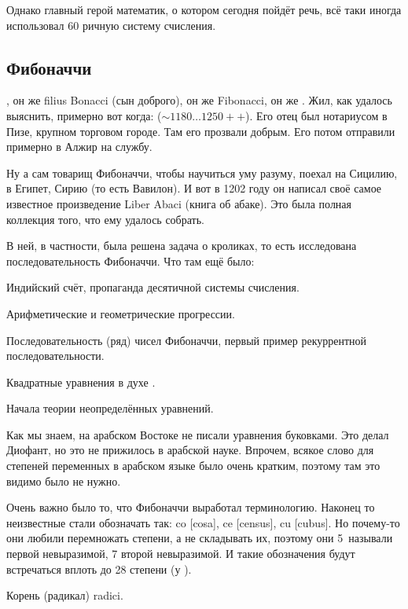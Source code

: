 \documentclass[a4paper,oneside,fleqn,10pt]{article}
\newcommand{\pe}[2]{${#1}\ldots{#2}$}
\begin{document}
Однако главный герой математик, о котором сегодня пойдёт речь, всё таки иногда
использовал 60 ричную систему счисления.

\subsection{Фибоначчи}

, он же filius Bonacci (сын доброго), он же
Fibonacci, он же . Жил, как удалось выяснить, примерно вот когда:
(\pe{\sim 1180}{1250{+}{+}}).
Его отец был нотариусом в Пизе, крупном торговом городе.
Там его прозвали добрым. Его потом отправили примерно в Алжир на службу.

Ну а сам товарищ Фибоначчи, чтобы научиться уму разуму, поехал на Сицилию, в Египет, Сирию (то есть Вавилон).
И вот в 1202 году он написал своё самое известное произведение Liber Abaci (книга об абаке).
Это была полная коллекция того, что ему удалось собрать.

В ней, в частности, была решена задача о кроликах, то есть исследована последовательность Фибоначчи.
Что там ещё было:

\begin{items}{-2}
\item Индийский счёт, пропаганда десятичной системы счисления.
\item Арифметические и геометрические прогрессии.
\item Последовательность (ряд) чисел Фибоначчи, первый пример рекуррентной последовательности.
\item Квадратные уравнения в духе .
\item Начала теории неопределённых уравнений.
\end{items}

Как мы знаем, на арабском Востоке не писали уравнения буковками. Это делал Диофант,
но это не прижилось в арабской науке. Впрочем, всякое слово для степеней переменных
в арабском языке было очень кратким, поэтому там это видимо было не нужно.

Очень важно было то, что Фибоначчи выработал  терминологию.
Наконец то неизвестные стали обозначать так: co [cosa], ce [census], cu [cubus].
Но почему-то они любили перемножать степени, а не складывать их, поэтому они 5~называли
первой невыразимой, 7 второй невыразимой. И такие обозначения будут встречаться
вплоть до 28 степени (у ).

Корень (радикал) radici.
\end{document}
